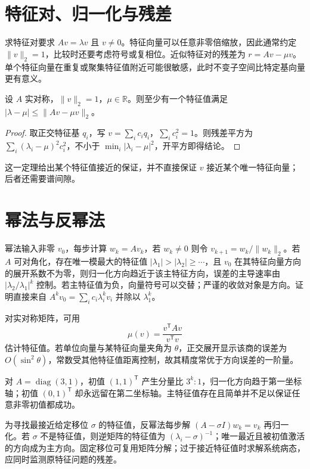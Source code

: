 \documentclass[UTF8,12pt,a4paper,fontset=fandol]{ctexbook}
\begin{document}
\section{特征对、归一化与残差}
求特征对要求 $Av=\lambda v$ 且 $v\ne0$。特征向量可以任意非零倍缩放，因此通常约定 $\|v\|_2=1$，比较时还要考虑符号或复相位。近似特征对的残差为 $r=Av-\mu v$。单个特征向量在重复或聚集特征值附近可能很敏感，此时不变子空间比特定基向量更有意义。

\begin{proposition}[对称矩阵的残差界]
设 $A$ 实对称，$\|v\|_2=1$，$\mu\in\mathbb R$。则至少有一个特征值满足 $|\lambda-\mu|\le\|Av-\mu v\|_2$。
\end{proposition}
\begin{proof}
取正交特征基 $q_i$，写 $v=\sum_i c_iq_i$，$\sum_i c_i^2=1$。则残差平方为 $\sum_i(\lambda_i-\mu)^2c_i^2$，不小于 $\min_i|\lambda_i-\mu|^2$，开平方即得结论。
\end{proof}
这一定理给出某个特征值接近的保证，并不直接保证 $v$ 接近某个唯一特征向量；后者还需要谱间隙。

\section{幂法与反幂法}
幂法输入非零 $v_0$，每步计算 $w_k=Av_k$，若 $w_k\ne0$ 则令 $v_{k+1}=w_k/\|w_k\|_2$。若 $A$ 可对角化，存在唯一模最大的特征值 $|\lambda_1|>|\lambda_2|\ge\cdots$，且 $v_0$ 在其特征向量方向的展开系数不为零，则归一化方向趋近于该主特征方向，误差的主导速率由 $|\lambda_2/\lambda_1|^k$ 控制。若主特征值为负，向量符号可以交替；严谨的收敛对象是方向。证明直接来自 $A^kv_0=\sum_i c_i\lambda_i^kv_i$ 并除以 $\lambda_1^k$。

对实对称矩阵，可用
\[
 \mu(v)=\frac{v^{\mathsf T}Av}{v^{\mathsf T}v}
\]
估计特征值。若单位向量与某特征向量夹角为 $\theta$，正交展开显示该商的误差为 $O(\sin^2\theta)$，常数受其他特征值距离控制，故其精度常优于方向误差的一阶量。

\begin{example}[缺失主方向的初值]
对 $A=\operatorname{diag}(3,1)$，初值 $(1,1)^{\mathsf T}$ 产生分量比 $3^k:1$，归一化方向趋于第一坐标轴；初值 $(0,1)^{\mathsf T}$ 却永远留在第二坐标轴。主特征值存在且简单并不足以保证任意非零初值都成功。
\end{example}

为寻找最接近给定移位 $\sigma$ 的特征值，反幂法每步解 $(A-\sigma I)w_k=v_k$ 再归一化。若 $\sigma$ 不是特征值，则逆矩阵的特征值为 $(\lambda_i-\sigma)^{-1}$；唯一最近且被初值激活的方向成为主方向。固定移位可复用矩阵分解；过于接近特征值时求解系统病态，应同时监测原特征问题的残差。
\end{document}
